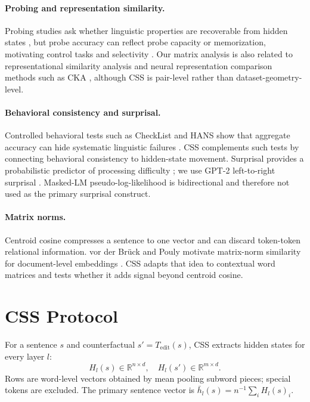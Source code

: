 \documentclass{article}
\begin{document}
\paragraph{Probing and representation similarity.}
Probing studies ask whether linguistic properties are recoverable from hidden states \cite{conneau2018senteval,tenney2019bert}, but probe accuracy can reflect probe capacity or memorization, motivating control tasks and selectivity \cite{hewitt2019designing}. Our matrix analysis is also related to representational similarity analysis \cite{kriegeskorte2008rsa} and neural representation comparison methods such as CKA \cite{kornblith2019cka}, although CSS is pair-level rather than dataset-geometry-level.

\paragraph{Behavioral consistency and surprisal.}
Controlled behavioral tests such as CheckList and HANS show that aggregate accuracy can hide systematic linguistic failures \cite{ribeiro2020checklist,mccoy2019hans}. CSS complements such tests by connecting behavioral consistency to hidden-state movement. Surprisal provides a probabilistic predictor of processing difficulty \cite{levy2008expectation}; we use GPT-2 left-to-right surprisal \cite{radford2019language}. Masked-LM pseudo-log-likelihood \cite{salazar2020masked} is bidirectional and therefore not used as the primary surprisal construct.

\paragraph{Matrix norms.}
Centroid cosine compresses a sentence to one vector and can discard token-token relational information. vor der Br{\"u}ck and Pouly motivate matrix-norm similarity for document-level embeddings \cite{vonderbruck2019matrix}. CSS adapts that idea to contextual word matrices and tests whether it adds signal beyond centroid cosine.

\section{CSS Protocol}

For a sentence $s$ and counterfactual $s'=T_{\mathrm{edit}}(s)$, CSS extracts hidden states for every layer $l$:
\begin{equation}
    H_l(s) \in \mathbb{R}^{n \times d}, \quad
    H_l(s') \in \mathbb{R}^{m \times d}.
\end{equation}
Rows are word-level vectors obtained by mean pooling subword pieces; special tokens are excluded. The primary sentence vector is $\bar{h}_l(s)=n^{-1}\sum_i H_l(s)_i$.
\end{document}
